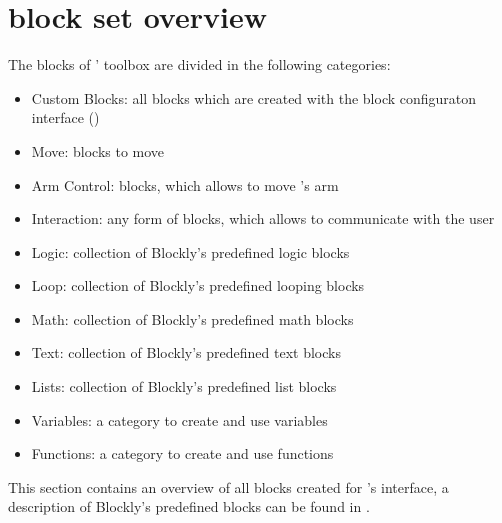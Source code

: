 \chapter{\hobbit{} block set overview} \label{apx:BlockOverview}
The blocks of \toolname{}' toolbox are divided in the following categories:

\begin{itemize}
    \item Custom Blocks: all blocks which are created with the block configuraton interface ()
    \item Move: blocks to move \hobbit{}
    \item Arm Control: blocks, which allows to move \hobbit{}'s arm
    \item Interaction: any form of blocks, which allows \hobbit{} to communicate with the user
    \item Logic: collection of Blockly's predefined logic blocks
    \item Loop: collection of Blockly's predefined looping blocks
    \item Math: collection of Blockly's predefined math blocks
    \item Text: collection of Blockly's predefined text blocks
    \item Lists: collection of Blockly's predefined list blocks
    \item Variables: a category to create and use variables
    \item Functions: a category to create and use functions
\end{itemize}

This section contains an overview of all blocks created for \hobbit{}'s interface, a description of Blockly's predefined blocks can be found in \cite{BlocklyBlockWiki}.

